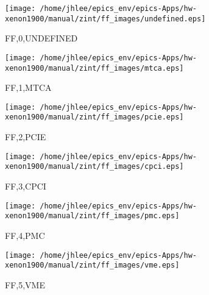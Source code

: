 \begin{figure}
  \centering
  \texttt{[image: /home/jhlee/epics\_env/epics-Apps/hw-xenon1900/manual/zint/ff\_images/undefined.eps]}
  \caption{FF,0,UNDEFINED}
\end{figure}
\begin{figure}
  \centering
  \texttt{[image: /home/jhlee/epics\_env/epics-Apps/hw-xenon1900/manual/zint/ff\_images/mtca.eps]}
  \caption{FF,1,MTCA}
\end{figure}
\begin{figure}
  \centering
  \texttt{[image: /home/jhlee/epics\_env/epics-Apps/hw-xenon1900/manual/zint/ff\_images/pcie.eps]}
  \caption{FF,2,PCIE}
\end{figure}
\begin{figure}
  \centering
  \texttt{[image: /home/jhlee/epics\_env/epics-Apps/hw-xenon1900/manual/zint/ff\_images/cpci.eps]}
  \caption{FF,3,CPCI}
\end{figure}
\begin{figure}
  \centering
  \texttt{[image: /home/jhlee/epics\_env/epics-Apps/hw-xenon1900/manual/zint/ff\_images/pmc.eps]}
  \caption{FF,4,PMC}
\end{figure}
\begin{figure}
  \centering
  \texttt{[image: /home/jhlee/epics\_env/epics-Apps/hw-xenon1900/manual/zint/ff\_images/vme.eps]}
  \caption{FF,5,VME}
\end{figure}
